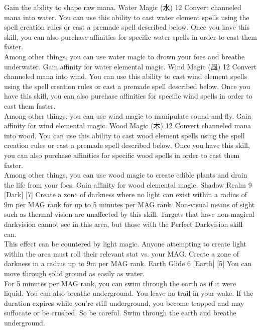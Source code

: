 \begin{pathele}
{Gain the ability to shape raw mana.}
\skilldescription
{Water Magic {\jpfont(水)}}
{12}
{Convert channeled mana into water. You can use this ability to cast water element spells using the spell creation rules or cast a premade spell described below. Once you have this skill, you can also purchase affinities for specific water spells in order to cast them faster.\\Among other things, you can use water magic to drown your foes and breathe underwater.}
{Gain affinity for water elemental magic.}
\skilldescription
{Wind Magic {\jpfont(風)}}
{12}
{Convert channeled mana into wind. You can use this ability to cast wind element spells using the spell creation rules or cast a premade spell described below. Once you have this skill, you can also purchase affinities for specific wind spells in order to cast them faster.\\
Among other things, you can use wind magic to manipulate sound and fly.}
{Gain affinity for wind elemental magic.}
\skilldescription
{Wood Magic {\jpfont(木)}}
{12}
{Convert channeled mana into wood. You can use this ability to cast wood element spells using the spell creation rules or cast a premade spell described below. Once you have this skill, you can also purchase affinities for specific wood spells in order to cast them faster.\\
Among other things, you can use wood magic to create edible plants and drain the life from your foes.}
{Gain affinity for wood elemental magic.}
\spelldescription
{Shadow Realm}
{9}
[Dark]
[7]
{Create a zone of darkness where no light can exist within a radius of 9m per MAG rank for up to 5 minutes per MAG rank. Non-visual means of sight such as thermal vision are unaffected by this skill. Targets that have non-magical darkvision cannot see in this area, but those with the Perfect Darkvision skill can.\\
This effect can be countered by light magic. Anyone attempting to create light within the area must roll their relevant stat vs. your MAG.}
{Create a zone of darkness in a radius up to 9m per MAG rank.}
\spelldescription
{Earth Glide}
{6}
[Earth]
[5]
{You can move through solid ground as easily as water.\\
For 5 minutes per MAG rank, you can swim through the earth as if it were liquid. You can also breathe underground. You leave no trail in your wake. If the duration expires while you're still underground, you become trapped and may suffocate or be crushed. So be careful.}
{Swim through the earth and breathe underground.}

\end{pathele}
